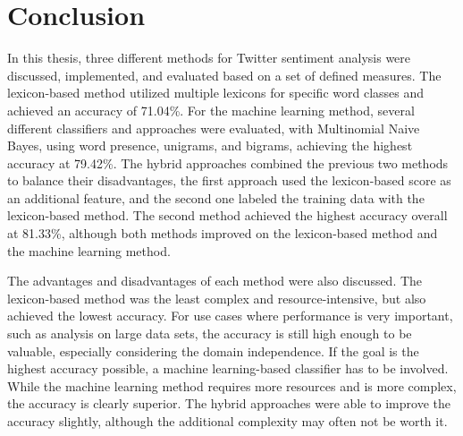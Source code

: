 \chapter{Conclusion}
\label{cha:Chapter7_Conclusion}

\iffalse

Length: 1-2 pages

Effort: 1-2 days


Zusammenfassung der Ergebnisse, Ausblick --> was kann man noch machen, auf Ergebnisse aufbauen, weiterfuehrende Themen

Beim Erstellen der Arbeit --> nicht jeder Idee hinterherrennen, eher dann fuer Conclusion

Implementation source code --> muss nicht sein, kann auch ein link auf github sein

\fi

In this thesis, three different methods for Twitter sentiment analysis were discussed, implemented, and evaluated based on a set of defined measures. The lexicon-based method utilized multiple lexicons for specific word classes and achieved an accuracy of 71.04\%. For the machine learning method, several different classifiers and approaches were evaluated, with Multinomial Naive Bayes, using word presence, unigrams, and bigrams, achieving the highest accuracy at 79.42\%. The hybrid approaches combined the previous two methods to balance their disadvantages, the first approach used the lexicon-based score as an additional feature, and the second one labeled the training data with the lexicon-based method. The second method achieved the highest accuracy overall at 81.33\%, although both methods improved on the lexicon-based method and the machine learning method.

The advantages and disadvantages of each method were also discussed. The lexicon-based method was the least complex and resource-intensive, but also achieved the lowest accuracy. For use cases where performance is very important, such as analysis on large data sets, the accuracy is still high enough to be valuable, especially considering the domain independence. If the goal is the highest accuracy possible, a machine learning-based classifier has to be involved. While the machine learning method requires more resources and is more complex, the accuracy is clearly superior. The hybrid approaches were able to improve the accuracy slightly, although the additional complexity may often not be worth it.

